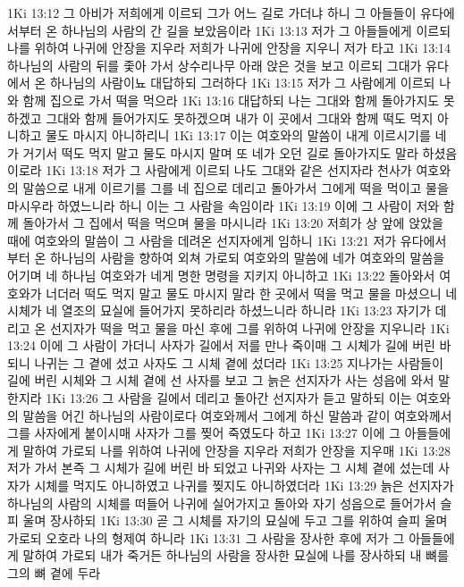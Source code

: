 1Ki 13:12  그 아비가 저희에게 이르되 그가 어느 길로 가더냐 하니 그 아들들이 유다에서부터 온 하나님의 사람의 간 길을 보았음이라
1Ki 13:13  저가 그 아들들에게 이르되 나를 위하여 나귀에 안장을 지우라 저희가 나귀에 안장을 지우니 저가 타고
1Ki 13:14  하나님의 사람의 뒤를 좇아 가서 상수리나무 아래 앉은 것을 보고 이르되 그대가 유다에서 온 하나님의 사람이뇨 대답하되 그러하다
1Ki 13:15  저가 그 사람에게 이르되 나와 함께 집으로 가서 떡을 먹으라
1Ki 13:16  대답하되 나는 그대와 함께 돌아가지도 못하겠고 그대와 함께 들어가지도 못하겠으며 내가 이 곳에서 그대와 함께 떡도 먹지 아니하고 물도 마시지 아니하리니
1Ki 13:17  이는 여호와의 말씀이 내게 이르시기를 네가 거기서 떡도 먹지 말고 물도 마시지 말며 또 네가 오던 길로 돌아가지도 말라 하셨음이로라
1Ki 13:18  저가 그 사람에게 이르되 나도 그대와 같은 선지자라 천사가 여호와의 말씀으로 내게 이르기를 그를 네 집으로 데리고 돌아가서 그에게 떡을 먹이고 물을 마시우라 하였느니라 하니 이는 그 사람을 속임이라
1Ki 13:19  이에 그 사람이 저와 함께 돌아가서 그 집에서 떡을 먹으며 물을 마시니라
1Ki 13:20  저희가 상 앞에 앉았을 때에 여호와의 말씀이 그 사람을 데려온 선지자에게 임하니
1Ki 13:21  저가 유다에서부터 온 하나님의 사람을 향하여 외쳐 가로되 여호와의 말씀에 네가 여호와의 말씀을 어기며 네 하나님 여호와가 네게 명한 명령을 지키지 아니하고
1Ki 13:22  돌아와서 여호와가 너더러 떡도 먹지 말고 물도 마시지 말라 한 곳에서 떡을 먹고 물을 마셨으니 네 시체가 네 열조의 묘실에 들어가지 못하리라 하셨느니라 하니라
1Ki 13:23  자기가 데리고 온 선지자가 떡을 먹고 물을 마신 후에 그를 위하여 나귀에 안장을 지우니라
1Ki 13:24  이에 그 사람이 가더니 사자가 길에서 저를 만나 죽이매 그 시체가 길에 버린 바 되니 나귀는 그 곁에 섰고 사자도 그 시체 곁에 섰더라
1Ki 13:25  지나가는 사람들이 길에 버린 시체와 그 시체 곁에 선 사자를 보고 그 늙은 선지자가 사는 성읍에 와서 말한지라
1Ki 13:26  그 사람을 길에서 데리고 돌아간 선지자가 듣고 말하되 이는 여호와의 말씀을 어긴 하나님의 사람이로다 여호와께서 그에게 하신 말씀과 같이 여호와께서 그를 사자에게 붙이시매 사자가 그를 찢어 죽였도다 하고
1Ki 13:27  이에 그 아들들에게 말하여 가로되 나를 위하여 나귀에 안장을 지우라 저희가 안장을 지우매
1Ki 13:28  저가 가서 본즉 그 시체가 길에 버린 바 되었고 나귀와 사자는 그 시체 곁에 섰는데 사자가 시체를 먹지도 아니하였고 나귀를 찢지도 아니하였더라
1Ki 13:29  늙은 선지자가 하나님의 사람의 시체를 떠들어 나귀에 실어가지고 돌아와 자기 성읍으로 들어가서 슬피 울며 장사하되
1Ki 13:30  곧 그 시체를 자기의 묘실에 두고 그를 위하여 슬피 울며 가로되 오호라 나의 형제여 하니라
1Ki 13:31  그 사람을 장사한 후에 저가 그 아들들에게 말하여 가로되 내가 죽거든 하나님의 사람을 장사한 묘실에 나를 장사하되 내 뼈를 그의 뼈 곁에 두라
